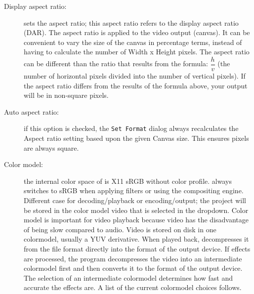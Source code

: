 \begin{description}
\item[Display aspect ratio:]  sets the aspect ratio; this aspect ratio refers to the display aspect ratio (DAR).  The aspect ratio is applied to the video output (canvas). It can be convenient to vary the size of the canvas in percentage terms, instead of having to calculate the number of Width x Height pixels. The aspect ratio can be different than the ratio that results from the formula: $\dfrac{h}{v}$ (the number of horizontal pixels divided into the number of vertical pixels).  If the aspect ratio differs from the results of the formula above, your output will be in non-square pixels.

\item[Auto aspect ratio:] if this option is checked, the \texttt{Set Format}
dialog always recalculates the Aspect ratio setting based upon the
given Canvas size. This ensures pixels are always square.

\item[Color model:]  the internal color space of \CGG{} is X11 sRGB
without color profile. \CGG{} always switches to sRGB when applying
filters or using the compositing engine. Different case for
decoding/playback or encoding/output; the project will be stored in
the color model video that is selected in the dropdown.  Color model
is important for video playback because video has the disadvantage
of being slow compared to audio.  Video is stored on disk in one
colormodel, usually a YUV derivative.  When played back, \CGG{}
decompresses it from the file format directly into the format of the
output device.  If effects are processed, the program decompresses
the video into an intermediate colormodel first and then converts it
to the format of the output device.  The selection of an
intermediate colormodel determines how fast and accurate the effects
are.  A list of the current colormodel choices follows.


\end{description}
